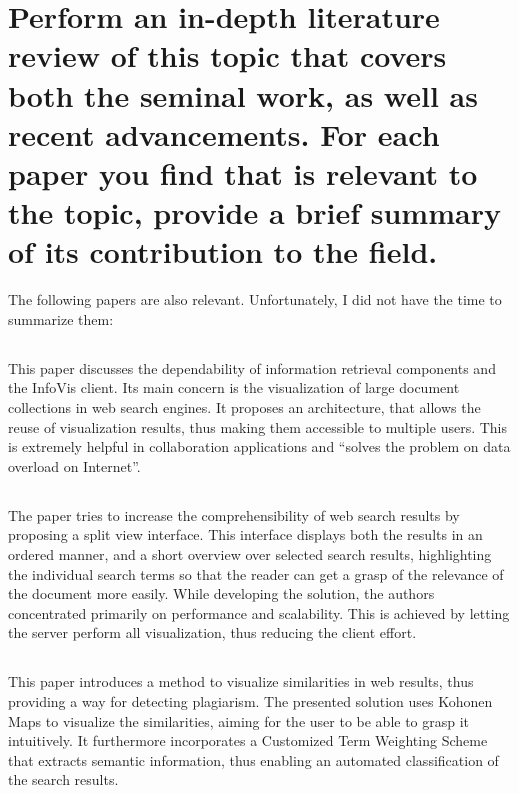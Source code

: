 \section{Perform an in-depth literature review of this topic that covers both the seminal work, as well as recent advancements. For each paper you find that is relevant to the topic, provide a brief summary of its contribution to the field.}
The following papers are also relevant. Unfortunately, I did not have the time to summarize them: \cite{Andrews2001, Berenci1999, Brin1998, Chang1999, Chirita2005, Cutting1992, Eick1994, Hearst1995, Heimonen2005, Jansen2001, Joho2004, Jones1998, Kobayashi2000, Kosala2000, Kules2006, Paek2004, Radlinski2006, Robertson1997, Sanderson1999, Spink2002, Spink2001, Sugiyama2004, Teevan2005, Vaughan2004, Wise1995, Zamir1998}

\subsection{\cite{Alonso2000}}
This paper discusses the dependability of information retrieval components and the InfoVis client. Its main concern is the visualization of large document collections in web search engines. It proposes an architecture, that allows the reuse of visualization results, thus making them accessible to multiple users. This is extremely helpful in collaboration applications and ``solves the problem on data overload on Internet''.

\subsection{\cite{Alonso2003}}
The paper tries to increase the comprehensibility of web search results by proposing a split view interface. This interface displays both the results in an ordered manner, and a short overview over selected search results, highlighting the individual search terms so that the reader can get a grasp of the relevance of the document more easily. While developing the solution, the authors concentrated primarily on performance and scalability. This is achieved by letting the server perform all visualization, thus reducing the client effort.

\subsection{\cite{Benjamin2008}}
This paper introduces a method to visualize similarities in web results, thus providing a way for detecting plagiarism. The presented solution uses Kohonen Maps to visualize the similarities, aiming for the user to be able to grasp it intuitively. It furthermore incorporates a Customized Term Weighting Scheme that extracts semantic information, thus enabling an automated classification of the search results.

